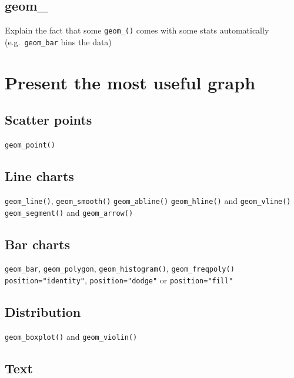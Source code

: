 \documentclass[
]{book}
\begin{document}
\hypertarget{geom_}{%
\subsection{geom\_}\label{geom_}}

Explain the fact that some \texttt{geom\_()} comes with some stats automatically (e.g.~\texttt{geom\_bar} bins the data)

\hypertarget{present-the-most-useful-graph}{%
\section{Present the most useful graph}\label{present-the-most-useful-graph}}

\hypertarget{scatter-points}{%
\subsection{Scatter points}\label{scatter-points}}

\texttt{geom\_point()}

\hypertarget{line-charts}{%
\subsection{Line charts}\label{line-charts}}

\texttt{geom\_line()}, \texttt{geom\_smooth()}
\texttt{geom\_abline()}
\texttt{geom\_hline()} and \texttt{geom\_vline()}
\texttt{geom\_segment()} and \texttt{geom\_arrow()}

\hypertarget{bar-charts}{%
\subsection{Bar charts}\label{bar-charts}}

\texttt{geom\_bar}, \texttt{geom\_polygon}, \texttt{geom\_histogram()}, \texttt{geom\_freqpoly()}
\texttt{position="identity"}, \texttt{position="dodge"} or \texttt{position="fill"}

\hypertarget{distribution}{%
\subsection{Distribution}\label{distribution}}

\texttt{geom\_boxplot()} and \texttt{geom\_violin()}

\hypertarget{text-1}{%
\subsection{Text}\label{text-1}}
\end{document}
